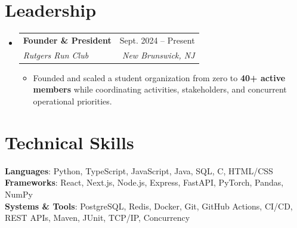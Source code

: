 \documentclass[letterpaper,10pt]{article}
\makeatletter
\newcommand{\resumeItem}[1]{\item\small{{#1}}}
\newcommand{\resumeSubheading}[4]{
  \vspace{-1pt}\item
    \begin{tabular*}{0.97\textwidth}[t]{l@{\extracolsep{\fill}}r}
      \textbf{#1} & #2 \\
      \textit{\small#3} & \textit{\small #4} \\
    \end{tabular*}\vspace{-6pt}
}
\newcommand{\resumeSubHeadingListStart}{\begin{itemize}[leftmargin=0.15in, label={}]}
\newcommand{\resumeSubHeadingListEnd}{\end{itemize}}
\newcommand{\resumeItemListStart}{\begin{itemize}[leftmargin=0.15in, itemsep=-3pt, topsep=0pt]}
\newcommand{\resumeItemListEnd}{\end{itemize}\vspace{-3pt}}
\makeatother
\begin{document}
\section{Leadership}
  \resumeSubHeadingListStart
    \resumeSubheading
      {Founder \& President}{Sept. 2024 -- Present}
      {Rutgers Run Club}{New Brunswick, NJ}
      \resumeItemListStart
        \resumeItem{Founded and scaled a student organization from zero to \textbf{40+ active members} while coordinating activities, stakeholders, and concurrent operational priorities.}
      \resumeItemListEnd
  \resumeSubHeadingListEnd

\section{Technical Skills}
 \begin{itemize}[leftmargin=0.15in, label={}]
    \small{\item{
     \textbf{Languages}{: Python, TypeScript, JavaScript, Java, SQL, C, HTML/CSS} \\
     \textbf{Frameworks}{: React, Next.js, Node.js, Express, FastAPI, PyTorch, Pandas, NumPy} \\
     \textbf{Systems \& Tools}{: PostgreSQL, Redis, Docker, Git, GitHub Actions, CI/CD, REST APIs, Maven, JUnit, TCP/IP, Concurrency}
    }}
 \end{itemize}
\end{document}

